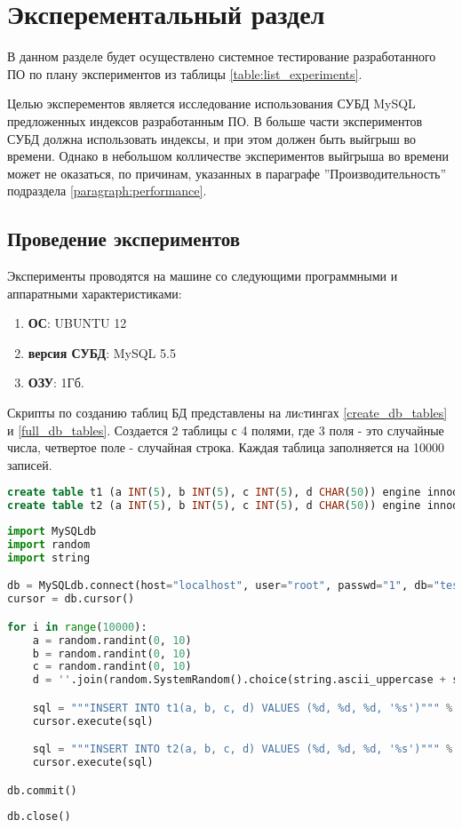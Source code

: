 \chapter{Эксперементальный раздел}

В данном разделе будет осуществлено системное тестирование разработанного ПО по плану экспериментов из таблицы \ref{table:list_experiments}. 

Целью эксперементов является исследование использования СУБД MySQL предложенных индексов разработанным ПО. В больше части экспериментов СУБД должна использовать  индексы, и при этом должен быть выйгрыш во времени. Однако в небольшом колличестве экспериментов выйгрыша во времени может не оказаться, по причинам, указанных в параграфе ''Производительность'' подраздела \ref{paragraph:performance}. 

\section{Проведение экспериментов}

Эксперименты проводятся на машине со следующими программными и аппаратными характеристиками:
\begin{enumerate}
\item \textbf{ОС}: UBUNTU 12
\item \textbf{версия СУБД}: MySQL 5.5
\item \textbf{ОЗУ}: 1Гб.
\end{enumerate}

Скрипты по созданию таблиц БД представлены на лиcтингах \ref{create_db_tables} и \ref{full_db_tables}. Создается 2 таблицы с 4 полями, где 3 поля - это случайные числа, четвертое поле - случайная строка. Каждая таблица заполняется на 10000 записей.

\begin{lstlisting}[language=sql, caption={Создание таблиц БД},label=create_db_tables]
create table t1 (a INT(5), b INT(5), c INT(5), d CHAR(50)) engine innodb;
create table t2 (a INT(5), b INT(5), c INT(5), d CHAR(50)) engine innodb;
\end{lstlisting}

\begin{lstlisting}[language=python, caption={Наполнение таблиц БД},label=full_db_tables]
import MySQLdb
import random
import string

db = MySQLdb.connect(host="localhost", user="root", passwd="1", db="test", charset='utf8')
cursor = db.cursor()

for i in range(10000):
    a = random.randint(0, 10)
    b = random.randint(0, 10)
    c = random.randint(0, 10)
    d = ''.join(random.SystemRandom().choice(string.ascii_uppercase + string.digits) for _ in range(30))

    sql = """INSERT INTO t1(a, b, c, d) VALUES (%d, %d, %d, '%s')""" % (a, b, c, d)
    cursor.execute(sql)

    sql = """INSERT INTO t2(a, b, c, d) VALUES (%d, %d, %d, '%s')""" % (a, b, c, d)
    cursor.execute(sql)

db.commit()
 
db.close()
\end{lstlisting}


